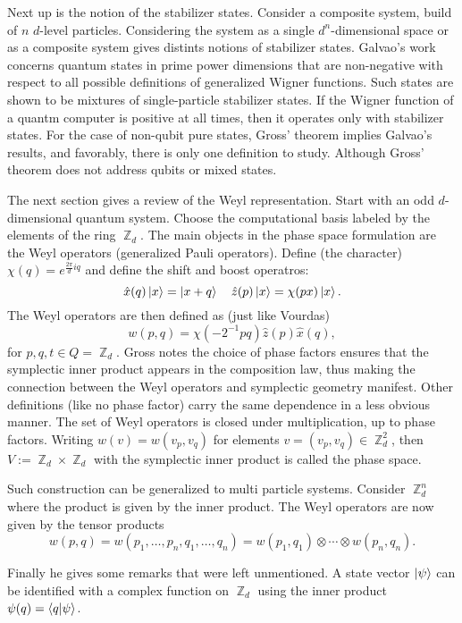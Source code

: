 \documentclass[a4paper]{article}
\DeclareMathOperator{\Z}{\mathbb{Z}}
\begin{document}
  Next up is the notion of the stabilizer states. Consider a
  composite system, build of $n$ $d$-level particles.
  Considering the system as a single $d^{n}$-dimensional
  space or as a composite system gives distints notions of
  stabilizer states. Galvao's work concerns quantum states
  in prime power dimensions that are non-negative with
  respect to all possible definitions of generalized Wigner
  functions. Such states are shown to be mixtures of
  single-particle stabilizer states. If the Wigner function
  of a quantm computer is positive at all times, then it
  operates only with stabilizer states. For the case of
  non-qubit pure states, Gross' theorem implies Galvao's
  results, and favorably, there is only one definition to
  study. Although Gross' theorem does not address qubits or
  mixed states.

  The next section gives a review of the Weyl
  representation. Start with an odd $d$-dimensional quantum
  system. Choose the computational basis labeled by the
  elements of the ring $\Z_d$. The main objects in the phase
  space formulation are the Weyl operators (generalized
  Pauli operators). Define (the character) $\chi(q) =
  e^{\frac{2\pi}{d}iq}$ and define the shift and boost
  operatros:
  \[
    \hat x(q) \ket x = \ket{x+q}
    \quad
    \hat z(p) \ket x = \chi(px) \ket x.
  \] 
  The Weyl operators are then defined as (just like Vourdas)
  \[
    w(p,q) = \chi(-2^{-1}pq) \hat z(p) \hat x(q),
  \] 
  for $p,q,t \in Q = \Z_d$. Gross notes the choice of phase
  factors ensures that the symplectic inner product appears
  in the composition law, thus making the connection between
  the Weyl operators and symplectic geometry manifest. Other
  definitions (like no phase factor) carry the same
  dependence in a less obvious manner. The set of Weyl
  operators is closed under multiplication, up to phase
  factors. Writing  $w(v) = w(v_p,v_q)$ for elements $v =
  (v_p,v_q) \in \Z_d^2$, then $V := \Z_d \times \Z_d$ with
  the symplectic inner product is called the phase space.

  Such construction can be generalized to multi particle
  systems. Consider $\Z_d^{n}$ where the product is given by
  the inner product. The Weyl operators are now given by the
  tensor products
  \[
    w(p,q)
    = w(p_1,\ldots,p_n,q_1,\ldots,q_n)
    = w(p_1,q_1) \otimes \cdots \otimes w(p_n,q_n).
  \] 

  Finally he gives some remarks that were left unmentioned.
  A state vector $\ket \psi$ can be identified with a
  complex function on $\Z_d$ using the inner product
  $\psi(q) = \braket{q|\psi}$.
\end{document}
